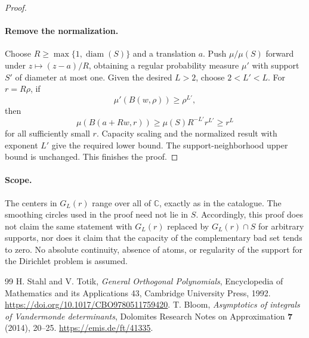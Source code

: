 \documentclass[11pt,a4paper]{article}
\theoremstyle{remark}
\begin{document}
\begin{proof}
\paragraph{Remove the normalization.}
Choose $R\ge\max\{1,\operatorname{diam}(S)\}$ and a translation $a$. Push $\mu/\mu(S)$ forward under $z\mapsto(z-a)/R$, obtaining a regular probability measure $\mu'$ with support $S'$ of diameter at most one. Given the desired $L>2$, choose $2<L'<L$. For $r=R\rho$, if
\[
 \mu'(B(w,\rho))\ge\rho^{L'},
\]
then
\[
 \mu(B(a+Rw,r))\ge \mu(S)R^{-L'}r^{L'}\ge r^L
\]
for all sufficiently small $r$. Capacity scaling and the normalized result with exponent $L'$ give the required lower bound. The support-neighborhood upper bound is unchanged. This finishes the proof.
\end{proof}

\paragraph{Scope.}
The centers in $G_L(r)$ range over all of $\mathbb C$, exactly as in the catalogue. The smoothing circles used in the proof need not lie in $S$. Accordingly, this proof does not claim the same statement with $G_L(r)$ replaced by $G_L(r)\cap S$ for arbitrary supports, nor does it claim that the capacity of the complementary bad set tends to zero. No absolute continuity, absence of atoms, or regularity of the support for the Dirichlet problem is assumed.


\begingroup\small
\begin{thebibliography}{99}
 H. Stahl and V. Totik, \emph{General Orthogonal Polynomials}, Encyclopedia of Mathematics and its Applications 43, Cambridge University Press, 1992. \url{https://doi.org/10.1017/CBO9780511759420}.
 T. Bloom, \emph{Asymptotics of integrals of Vandermonde determinants}, Dolomites Research Notes on Approximation \textbf{7} (2014), 20--25. \url{https://emis.de/ft/41335}.
\end{thebibliography}
\endgroup
\end{document}
